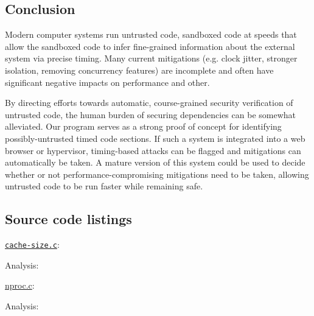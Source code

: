 \documentclass[12pt]{article}
\begin{document}
\begin{multicols*}{2}
  \section{Conclusion}

  Modern computer systems run untrusted code, sandboxed code at speeds
  that allow the sandboxed code to infer fine-grained information
  about the external system via precise timing. Many current
  mitigations (e.g. clock jitter, stronger isolation, removing
  concurrency features) are incomplete and often have significant
  negative impacts on performance and other.

  By directing efforts towards automatic, course-grained security
  verification of untrusted code, the human burden of securing
  dependencies can be somewhat alleviated. Our program serves as a
  strong proof of concept for identifying possibly-untrusted timed
  code sections. If such a system is integrated into a web browser or
  hypervisor, timing-based attacks can be flagged and mitigations can
  automatically be taken. A mature version of this system could be
  used to decide whether or not performance-compromising mitigations
  need to be taken, allowing untrusted code to be run faster while
  remaining safe.
\end{multicols*}




\newpage
\begin{appendices}
\section{Source code listings}
\texttt{\href{https://github.com/jpdoyle/static-analysis-project/blob/master/clock-analysis/data/cache-size.c}{cache-size.c}}:
    
    Analysis:
    

\newpage
\href{https://github.com/jpdoyle/static-analysis-project/blob/master/clock-analysis/data/nproc.c}
      {nproc.c}:
    

    Analysis:
    
\end{appendices}
\end{document}
